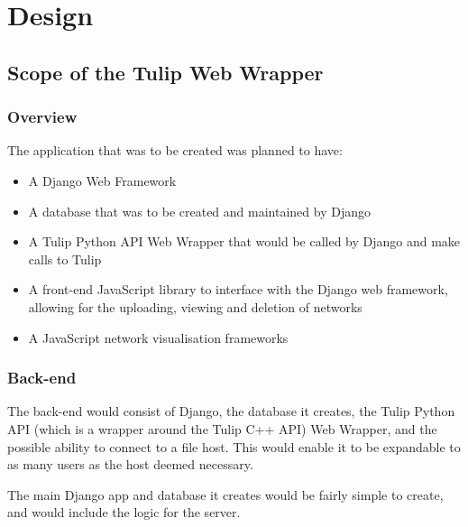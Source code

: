 \documentclass[../dissertation.tex]{subfiles}
\begin{document}
\chapter{Design}

\section{Scope of the Tulip Web Wrapper}
\label{sec:scope}

\subsection{Overview}

The application that was to be created was planned to have:

\begin{itemize}
    \item A Django Web Framework
    \item A database that was to be created and maintained by Django
    \item A Tulip Python API Web Wrapper that would be called by Django and make calls to Tulip
    \item A front-end JavaScript library to interface with the Django web framework, allowing for the uploading, viewing and deletion of networks
    \item A JavaScript network visualisation frameworks
\end{itemize}

\subsection{Back-end}
\label{sec:overview-backend}

The back-end would consist of Django, the database it creates, the Tulip Python API (which is a wrapper around the Tulip C++ API) Web Wrapper, and the possible ability to connect to a file host. This would enable it to be expandable to as many users as the host deemed necessary.

The main Django app and database it creates would be fairly simple to create, and would include the logic for the server.
\end{document}
